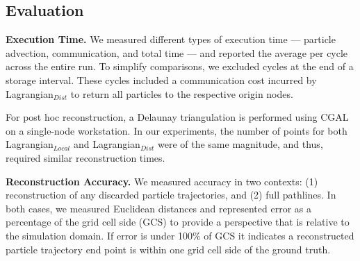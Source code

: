 \subsection{Evaluation}
\label{sec:metrics}
%
\textbf{Execution Time.} We measured different types of execution time --- particle advection, communication, and total time --- and reported the average per cycle across the entire run.
%
To simplify comparisons, we excluded cycles at the end of a storage interval. 
%
These cycles included a communication cost incurred by Lagrangian$_{Dist}$ to return all particles to the respective origin nodes. 
%

For post hoc reconstruction, a Delaunay triangulation is performed using CGAL~\cite{2020cgal} on a single-node workstation.
%
In our experiments, the number of points for both Lagrangian$_{Local}$ and Lagrangian$_{Dist}$ were of the same magnitude, and thus, required similar reconstruction times.
%
%
%
%
%
%

\textbf{Reconstruction Accuracy.} We measured accuracy in two contexts: (1) reconstruction of any discarded particle trajectories, and (2) full pathlines.  
%
In both cases, we measured Euclidean distances and represented error as a percentage of the grid cell side (GCS) to provide a perspective that is relative to the simulation domain.
%
If error is under 100\% of GCS it indicates a reconstructed particle trajectory end point is within one grid cell side of the ground truth.

